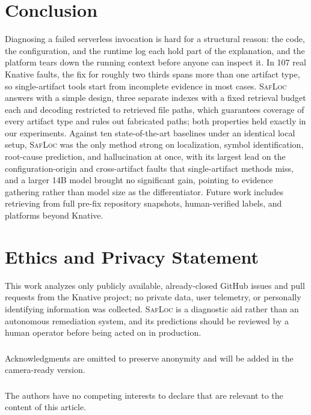 \documentclass[runningheads]{llncs}
\begin{document}
\section{Conclusion}
\label{sec:conclusion}

Diagnosing a failed serverless invocation is hard for a structural reason: the code, the configuration, and the runtime log each hold part of the explanation, and the platform tears down the running context before anyone can inspect it. In 107 real Knative faults, the fix for roughly two thirds spans more than one artifact type, so single-artifact tools start from incomplete evidence in most cases. \textsc{SafLoc} answers with a simple design, three separate indexes with a fixed retrieval budget each and decoding restricted to retrieved file paths, which guarantees coverage of every artifact type and rules out fabricated paths; both properties held exactly in our experiments. Against ten state-of-the-art baselines under an identical local setup, \textsc{SafLoc} was the only method strong on localization, symbol identification, root-cause prediction, and hallucination at once, with its largest lead on the configuration-origin and cross-artifact faults that single-artifact methods miss, and a larger 14B model brought no significant gain, pointing to evidence gathering rather than model size as the differentiator. Future work includes retrieving from full pre-fix repository snapshots, human-verified labels, and platforms beyond Knative.

\section*{Ethics and Privacy Statement}

This work analyzes only publicly available, already-closed GitHub issues and pull requests from the Knative project; no private data, user telemetry, or personally identifying information was collected. \textsc{SafLoc} is a diagnostic aid rather than an autonomous remediation system, and its predictions should be reviewed by a human operator before being acted on in production.

\begin{credits}
\subsubsection{\ackname}
Acknowledgments are omitted to preserve anonymity and will be added in the camera-ready version.

\subsubsection{\discintname}
The authors have no competing interests to declare that are relevant to the content of this article.
\end{credits}

\footnotesize

\end{document}

